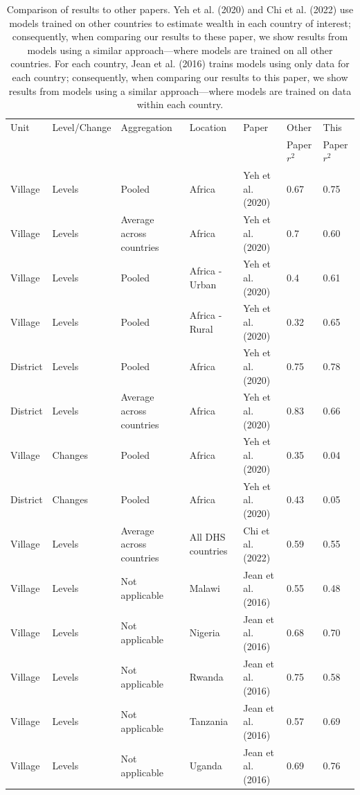 \documentclass{article}
\begin{document}
\singlespacing
\begin{table}[H]
\caption{Comparison of results to other papers. Yeh et al. (2020) and Chi et al. (2022) use models trained on other countries to estimate wealth in each country of interest; consequently, when comparing our results to these paper, we show results from models using a similar approach---where models are trained on all other countries. For each country, Jean et al. (2016) trains models using only data for each country; consequently, when comparing our results to this paper, we show results from models using a similar approach---where models are trained on data within each country.}
\label{fig:compare_other_papers}
\centering 
\begin{tabular}{lllllll}
\hline
Unit & Level/Change & Aggregation & Location & Paper & Other       & This \\
     &              &             &          &       & Paper $r^2$ & Paper $r^2$ \\

\hline
Village  & Levels  & Pooled                   & Africa         & Yeh et al. (2020) & 0.67 & 0.75 \\
Village  & Levels  & Average across countries & Africa         & Yeh et al. (2020) & 0.7 & 0.60 \\
Village  & Levels  & Pooled                   & Africa - Urban & Yeh et al. (2020) & 0.4 & 0.61 \\
Village  & Levels  & Pooled                   & Africa - Rural & Yeh et al. (2020) & 0.32 & 0.65 \\
District & Levels  & Pooled                   & Africa         & Yeh et al. (2020) & 0.75 & 0.78 \\
District & Levels  & Average across countries & Africa         & Yeh et al. (2020) & 0.83 & 0.66 \\
Village  & Changes & Pooled                   & Africa         & Yeh et al. (2020) & 0.35 & 0.04  \\
District & Changes & Pooled                   & Africa         & Yeh et al. (2020) & 0.43 & 0.05  \\
\hline
Village & Levels   & Average across countries & All DHS countries & Chi et al. (2022) & 0.59 & 0.55 \\
\hline 
Village & Levels   & Not applicable           & Malawi            & Jean et al. (2016) & 0.55 & 0.48 \\
Village & Levels   & Not applicable           & Nigeria           & Jean et al. (2016) & 0.68 & 0.70 \\
Village & Levels   & Not applicable           & Rwanda            & Jean et al. (2016) & 0.75 & 0.58 \\
Village & Levels   & Not applicable           & Tanzania          & Jean et al. (2016) & 0.57 & 0.69 \\
Village & Levels   & Not applicable           & Uganda            & Jean et al. (2016) & 0.69 & 0.76 \\
\hline 
\end{tabular}
\end{table}
\doublespacing
\end{document}

